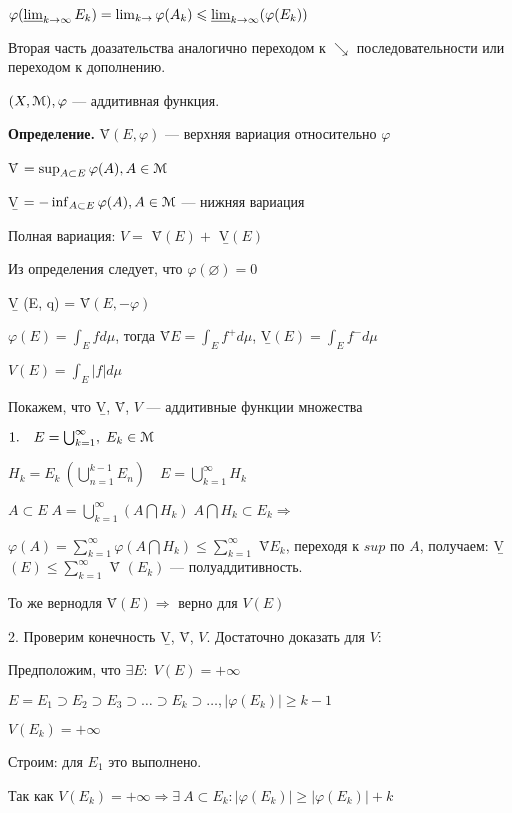 $\varphi(\varliminf_{k \rightarrow \infty} E_k) = \lim_{k
\rightarrow} \varphi(A_k) \leqslant \varliminf_{k \rightarrow
\infty}(\varphi(E_k))$

Вторая часть доазательства аналогично переходом к $\searrow$
последовательности или переходом к дополнению.

$(X, \EuScript{M}), \varphi$ --- аддитивная функция.

\textbf{Определение.} \quad \={V}$(E, \varphi)$ --- верхняя
вариация относительно $\varphi$

\={V} $= \sup_{A \subset E} \varphi(A), A \in \EuScript{M}$

\b{V} $= - \inf_{A \subset E} \varphi(A), A \in \EuScript{M}$ ---
нижняя вариация

Полная вариация: $V = $ \={V}$(E) + $ \b{V}$(E)$

Из определения следует, что $\varphi(\varnothing) = 0$

\b{V} (E, q) = \={V}$(E, -\varphi)$

$\varphi(E) = \int_E f d \mu$, тогда \={V}$E = \int_E f^+ d\mu$,
\b{V}$(E) = \int_E f^- d\mu$

$V(E) = \int_E |f| d \mu$

Покажем, что \b{V}, \={V}, $V$ --- аддитивные функции множества

$1. \quad E = \bigcup_{k=1}^\infty, \; E_k \in \EuScript{M}$

$H_k = E_k \ (\bigcup_{n=1}^{k-1} E_n) \quad E =
\bigcup_{k=1}^\infty H_k$

$A \subset E \; A = \bigcup_{k=1}^\infty (A \bigcap H_k) \; A
\bigcap H_k \subset E_k \Rightarrow$

$\varphi(A) = \sum_{k=1}^\infty \varphi(A \bigcap H_k) \leqslant
\sum_{k=1}^\infty$ \={V}$ E_k $, переходя к $sup$ по $A$,
получаем:  \b{V}$(E) \leqslant \sum_{k=1}^\infty$ \={V} $(E_k)$
--- полуаддитивность.

То же вернодля \={V}$(E) \Rightarrow$ верно для $V(E)$

2. Проверим конечность \quad \b{V}, \={V}, $V$. Достаточно
доказать для $V$:

Предположим, что $\exists E: \; V(E) = +\infty$

$E = E_1 \supset E_2 \supset E_3 \supset \ldots \supset E_k
\supset \ldots , |\varphi(E_k)| \geqslant k - 1$

$V(E_k) = + \infty$

Строим: для $E_1$ это выполнено.

%
%
%
%
%
%
%
%
%
%
%
%
Так как $V(E_k) = + \infty \Rightarrow \exists \: A \subset E_k:
|\varphi(E_k)| \geqslant |\varphi(E_k)| + k$

